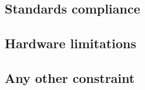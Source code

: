 \subsection{Standards compliance}
\label{subsect:Standards compliance}
\subsection{Hardware limitations}
\label{subsect:Hardware limitations}
\subsection{Any other constraint}
\label{subsect:Any other constraint}
